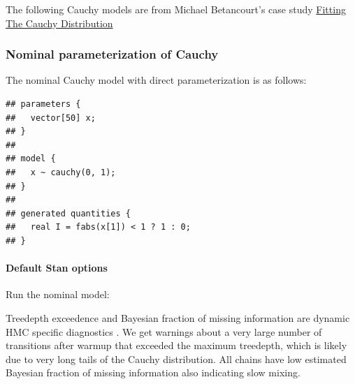 \documentclass[american,]{article}
\let\oldparagraph\paragraph
\renewcommand{\paragraph}[1]{\oldparagraph{#1}\mbox{}}
\begin{document}
The following Cauchy models are from Michael Betancourt's case study
\href{https://betanalpha.github.io/assets/case_studies/fitting_the_cauchy.html}{Fitting
The Cauchy Distribution}

\hypertarget{nominal-parameterization-of-cauchy}{%
\subsubsection{Nominal parameterization of
Cauchy}\label{nominal-parameterization-of-cauchy}}

The nominal Cauchy model with direct parameterization is as follows:

\begin{verbatim}
## parameters {
##   vector[50] x;
## }
## 
## model {
##   x ~ cauchy(0, 1);
## }
## 
## generated quantities {
##   real I = fabs(x[1]) < 1 ? 1 : 0;
## }
\end{verbatim}

\hypertarget{default-stan-options}{%
\paragraph{Default Stan options}\label{default-stan-options}}

Run the nominal model:

Treedepth exceedence and Bayesian fraction of missing information are
dynamic HMC specific diagnostics \citep{betancourt2017conceptual}. We
get warnings about a very large number of transitions after warmup that
exceeded the maximum treedepth, which is likely due to very long tails
of the Cauchy distribution. All chains have low estimated Bayesian
fraction of missing information also indicating slow mixing.
\end{document}
